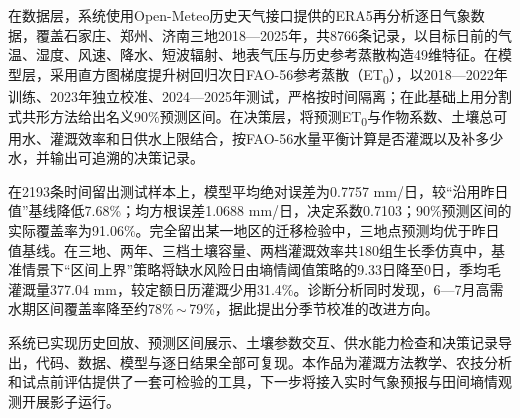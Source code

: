\documentclass[UTF8,a4paper,11pt,fontset=fandol]{ctexart}
\begin{document}
在数据层，系统使用Open-Meteo历史天气接口提供的ERA5再分析逐日气象数据，覆盖石家庄、郑州、济南三地2018—2025年，共8766条记录，以目标日前的气温、湿度、风速、降水、短波辐射、地表气压与历史参考蒸散构造49维特征。在模型层，采用直方图梯度提升树回归次日FAO-56参考蒸散（ET\textsubscript{0}），以2018—2022年训练、2023年独立校准、2024—2025年测试，严格按时间隔离；在此基础上用分割式共形方法给出名义90\%预测区间。在决策层，将预测ET\textsubscript{0}与作物系数、土壤总可用水、灌溉效率和日供水上限结合，按FAO-56水量平衡计算是否灌溉以及补多少水，并输出可追溯的决策记录。

在2193条时间留出测试样本上，模型平均绝对误差为0.7757 mm/日，较“沿用昨日值”基线降低7.68\%；均方根误差1.0688 mm/日，决定系数0.7103；90\%预测区间的实际覆盖率为91.06\%。完全留出某一地区的迁移检验中，三地点预测均优于昨日值基线。在三地、两年、三档土壤容量、两档灌溉效率共180组生长季仿真中，基准情景下“区间上界”策略将缺水风险日由墒情阈值策略的9.33日降至0日，季均毛灌溉量377.04 mm，较定额日历灌溉少用31.4\%。诊断分析同时发现，6—7月高需水期区间覆盖率降至约78\%\,$\sim$\,79\%，据此提出分季节校准的改进方向。

系统已实现历史回放、预测区间展示、土壤参数交互、供水能力检查和决策记录导出，代码、数据、模型与逐日结果全部可复现。本作品为灌溉方法教学、农技分析和试点前评估提供了一套可检验的工具，下一步将接入实时气象预报与田间墒情观测开展影子运行。
\end{document}
